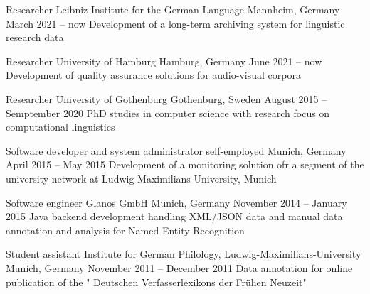 \documentclass[11pt, a4]{academic-cv}
\begin{document}
\begin{cventries}
\cventry
{Researcher} %
{ Leibniz-Institute for the German Language} %
{Mannheim, Germany} %
{March 2021 -- now} %
{
Development of a long-term archiving system for linguistic research data
}

\cventry
{Researcher} %
{ University of Hamburg} %
{Hamburg, Germany} %
{June 2021 -- now} %
{
Development of quality assurance solutions for audio-visual corpora
}

\cventry
{Researcher} %
{ University of Gothenburg} %
{Gothenburg, Sweden} %
{August 2015 -- Semptember 2020} %
{
PhD studies in computer science with research focus on computational linguistics
}

\cventry
{Software developer and system administrator} %
{self-employed} %
{Munich, Germany} %
{April 2015 -- May 2015} %
{
Development of a monitoring solution ofr a segment of the university network at Ludwig-Maximilians-University, Munich
}

\cventry
{Software engineer} %
{ Glanos GmbH} %
{Munich, Germany} %
{November 2014 -- January 2015} %
{
Java backend development handling XML/JSON data and manual data annotation and analysis for Named Entity Recognition
}

\cventry
{Student assistant} %
{ Institute for German Philology, Ludwig-Maximilians-University} %
{Munich, Germany} %
{November 2011 -- December 2011} %
{
Data annotation for online publication of the " Deutschen Verfasserlexikons der Frühen Neuzeit"
}


\end{cventries}
\end{document}
